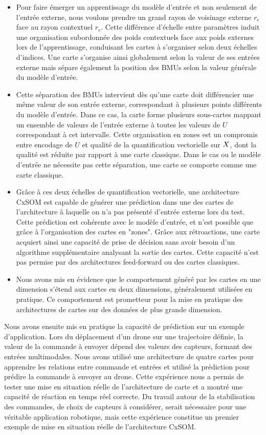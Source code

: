 \begin{itemize}
    \item Pour faire émerger un apprentissage du modèle d'entrée et non seulement de l'entrée externe, nous voulons prendre un grand rayon de voisinage externe $r_e$ face au rayon contextuel $r_c$. Cette différence d'échelle entre paramètres induit une organisation subordonnée des poids contextuels face aux poids externes lors de l'apprentissage, conduisant les cartes à s'organiser selon deux échelles d'indices. Une carte s'organise ainsi globalement selon la valeur de ses entrées externe mais sépare également la position des BMUs selon la valeur générale du modèle d'entrée.
    \item Cette séparation des BMUs intervient dès qu'une carte doit différencier une même valeur de son entrée externe, correspondant à plusieurs points différents du modèle d'entrée. Dans ce cas, la carte forme plusieurs sous-cartes mappant un ensemble de valeurs de l'entrée externe à toutes les valeurs de $U$ correspondant à cet intervalle. Cette organisation en zones est un compromis entre encodage de $U$ et qualité de la quantification vectorielle sur $X$, dont la qualité est réduite par rapport à une carte classique. Dans le cas ou le modèle d'entrée ne nécessite pas cette séparation, une carte se comporte comme une carte classique.
    \item Grâce à ces deux échelles de quantification vectorielle, une architecture CxSOM est capable de générer une prédiction dans une des cartes de l'architecture à laquelle on n'a pas présenté d'entrée externe lors du test.
    Cette prédiction est cohérente avec le modèle d'entrée, et n'est possible que grâce à l'organisation des cartes en "zones". Grâce aux rétroactions, une carte acquiert ainsi une capacité de prise de décision sans avoir besoin d'un algorithme supplémentaire analysant la sortie des cartes. Cette capacité n'est pas permise par des architectures feed-forward ou des cartes classiques. 
    \item Nous avons mis en évidence que le comportement généré par les cartes en une dimension s'étend aux cartes en deux dimensions, généralement utilisées en pratique. Ce comportement est prometteur pour la mise en pratique des architectures de cartes sur des données de plus grande dimension.
\end{itemize}

Nous avons ensuite mis en pratique la capacité de prédiction sur un exemple d'application. Lors du déplacement d'un drone sur une trajectoire définie, la valeur de la commande à envoyer dépend des valeurs des capteurs, formant des entrées multimodales. Nous avons utilisé une architecture de quatre cartes pour apprendre les relations entre commande et entrées et utilisé la prédiction pour prédire la commande à envoyer au drone. Cette expérience nous a permis de tester une mise en situation réelle de l'architecture de carte et a montré une capacité de réaction en temps réel correcte. Du travail autour de la stabilisation des commandes, de choix de capteurs à considérer, serait nécessaire pour une véritable application robotique, mais cette expérience constitue un premier exemple de mise en situation réelle de l'architecture CxSOM.

